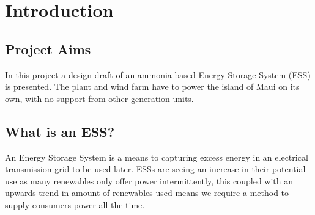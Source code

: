 

\section{Introduction}
\subsection{Project Aims}

In this project a design draft of an ammonia-based Energy Storage System (ESS) is presented.
The plant and wind farm have to power the island of Maui on its own, with no support from other generation units.


\subsection{What is an ESS?}

An Energy Storage System is a means to capturing excess energy in an electrical transmission grid to be used later.
ESSs are seeing an increase in their potential use as many renewables only offer power intermittently, this coupled with an upwards trend in amount of renewables used \cite{intro:growth} means we require a method to supply consumers power all the time.

